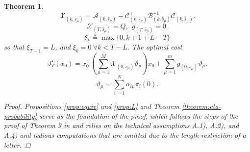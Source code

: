\documentclass[journal,twoside,web]{ieeecolor}
\newtheorem{theorem}{Theorem}
\begin{document}
\begin{theorem}
\begin{equation}\label{eq:fh-x}
    \mathcal{X}_{(k,\hat{s}_{\mu})} = \mathcal{A}_{(k,\hat{s}_{\mu})} - \mathcal{C}_{(k,\hat{s}_{\mu})}^{\top} \mathcal{B}_{(k,\hat{s}_{\mu})}^{-1} \mathcal{C}_{(k,\hat{s}_{\mu})}.
\end{equation}    
\begin{equation}\label{eq:fh-x-g-t}
    \mathcal{X}_{(T,\hat{s}_{\mu})} = Q,~~
    g_{(T,\hat{s}_{\mu})} = 0. 
\end{equation}
\begin{equation}\label{eq:xik}
    \xi_k \triangleq \max \{0, k+1+L-T \}
\end{equation}
    so that $\xi_{T-1}=L$, and $\xi_{k} = 0~ \forall k<T-L$. The optimal cost %
\begin{equation}\label{eq:fh-cost}
   J_{T}^{\star}(x_0) = x_{0}^{\top}\left( \sum_{\mu=1}^{M}  \mathcal{X}_{(0,\hat{s}_{\mu})} \vartheta_{\mu} \right) x_{0} +
    \sum_{\mu=1}^{m} g_{(0,\hat{s}_{\mu})} \vartheta_{\mu}.
\end{equation}
\begin{equation}\label{eq:init-distrib-mu}
    \vartheta_{\mu} = \sum_{i=1}^{N} \alpha_{i\mu} \pi_{i}(0).
\end{equation}
\begin{proof}
Propositions \ref{prop:equiv} and \ref{prop:L} and Theorem \ref{theorem:eta-probability} serve as the foundation of the proof, which follows the steps of the proof of Theorem 9 in \cite{yZL-2025-automatica} and relies on the technical assumptions A.1), A.2), and A.4) and tedious computations that are omitted due to the length restriction of a letter.
\end{proof}
\end{theorem}






\end{document}
